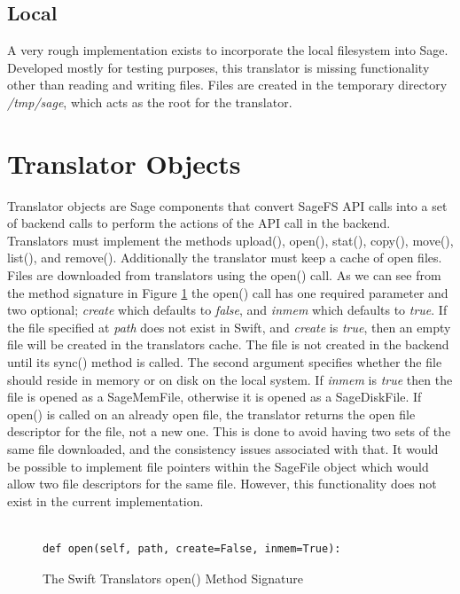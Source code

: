 \subsection{Local}

A very rough implementation exists to incorporate the local filesystem into Sage. Developed mostly for testing purposes, this translator is missing functionality other than reading and writing files. Files are created in the temporary directory \textit{/tmp/sage}, which acts as the root for the translator.

\section{Translator Objects}

Translator objects are Sage components that convert SageFS API calls into a set of backend calls to perform the actions of the API call in the backend. Translators must implement the methods upload(), open(), stat(), copy(), move(), list(), and remove(). Additionally the translator must keep a cache of open files. Files are downloaded from translators using the open() call. As we can see from the method signature in Figure \ref{fig:swifttropen} the open() call has one required parameter and two optional; \textit{create} which defaults to \textit{false}, and \textit{inmem} which defaults to \textit{true}. If the file specified at \textit{path} does not exist in Swift, and \textit{create} is \textit{true}, then an empty file will be created in the translators cache. The file is not  created in the backend until its sync() method is called. The second argument specifies whether the file should reside in memory or on disk on the local system. If \textit{inmem} is \textit{true} then the file is opened as a SageMemFile, otherwise it is opened as a SageDiskFile. If open() is called on an already open file, the translator returns the open file descriptor for the file, not a new one. This is done to avoid having two sets of the same file downloaded, and the consistency issues associated with that. It would be possible to implement file pointers within the SageFile object which would allow two file descriptors for the same file. However, this functionality does not exist in the current implementation.

\begin{figure}[h]
\begin{lstlisting}

def open(self, path, create=False, inmem=True):

\end{lstlisting}
\caption{The Swift Translators open() Method Signature}
\label{fig:swifttropen}
\end{figure}

